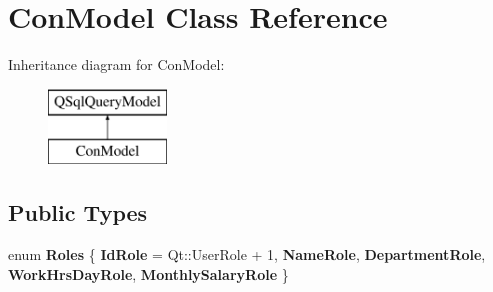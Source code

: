 \hypertarget{class_con_model}{}\section{Con\+Model Class Reference}
\label{class_con_model}
Inheritance diagram for Con\+Model\+:\begin{figure}[H]
\begin{center}
\leavevmode
\includegraphics[height=2.000000cm]{class_con_model}
\end{center}
\end{figure}
\subsection*{Public Types}
\begin{DoxyCompactItemize}
\item 
\mbox{\label{class_con_model_a7fc2a548f548de69b4b31b3c0e3fe7e4}} 
enum {\bfseries Roles} \{ \newline
{\bfseries Id\+Role} = Qt\+:\+:User\+Role + 1, 
{\bfseries Name\+Role}, 
{\bfseries Department\+Role}, 
{\bfseries Work\+Hrs\+Day\+Role}, 
\newline
{\bfseries Monthly\+Salary\+Role}
 \}
\end{DoxyCompactItemize}

